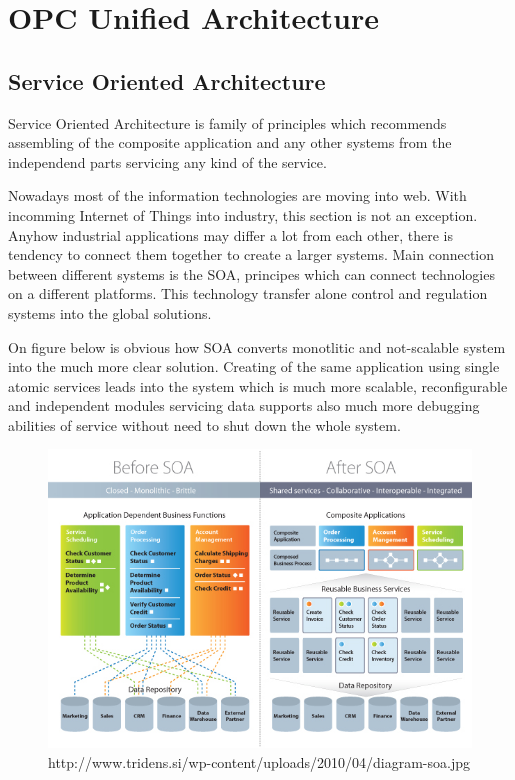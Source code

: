 
\chapter{OPC Unified Architecture} %

\label{Chapter3} %


\section{Service Oriented Architecture}

Service Oriented Architecture is family of principles which recommends assembling of the composite application and any other systems from the independend parts servicing any kind of the service. 

Nowadays most of the information technologies are moving into web. With incomming Internet of Things into industry, this section is not an exception. 
Anyhow industrial applications may differ a lot from each other, there is tendency to connect them together to create a larger systems. Main connection between different systems is the SOA, principes which can connect technologies on a different platforms. This technology transfer alone control and regulation systems into the global solutions. 


On figure below is obvious how SOA converts monotlitic and not-scalable system into the much more clear solution. Creating of the same application using single atomic services leads into the system which is much more scalable, reconfigurable and independent modules servicing data supports also much more debugging abilities of service without need to shut down the whole system.

\begin{figure}[hbp]
\centering
\includegraphics[scale=0.3]{Figures/diagram-soa}
\decoRule
\caption[4DIAC IDE Deployment Perspective ]{http://www.tridens.si/wp-content/uploads/2010/04/diagram-soa.jpg}
\label{4DIAC IDE Deployment Perspective}
\end{figure}


